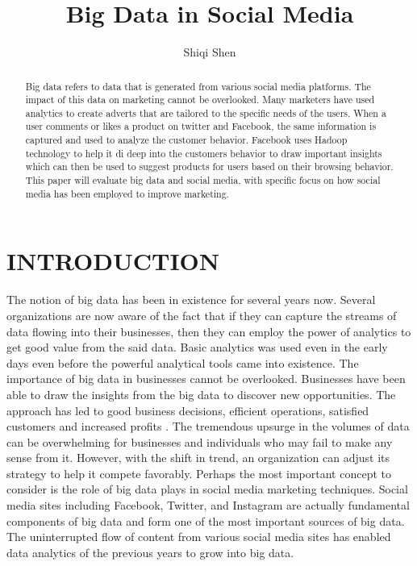 \documentclass[sigconf]{acmart}
\begin{document}
\title{Big Data in Social Media}


\author{Shiqi Shen}


\begin{abstract}

    Big data refers to data that is generated from various social media platforms. The impact of this data on marketing cannot be overlooked. Many marketers have used analytics to create adverts that are tailored to the specific needs of the users. When a user comments or likes a product on twitter and Facebook, the same information is captured and used to analyze the customer behavior. Facebook uses Hadoop technology to help it di deep into the customers behavior to draw important insights which can then be used to suggest products for users based on their browsing behavior. This paper will evaluate big data and social media, with specific focus on how social media has been employed to improve marketing.
    
\end{abstract}


\maketitle

\section{INTRODUCTION}

The notion of big data has been in existence for several years now. Several organizations are now aware of the fact that if they can capture the streams of data flowing into their businesses, then they can employ the power of analytics to get good value from the said data. Basic analytics was used even in the early days even before the powerful analytical tools came into existence. The importance of big data in businesses cannot be overlooked. Businesses have been able to draw the insights from the big data to discover new opportunities. The approach has led to good business decisions, efficient operations, satisfied customers and increased profits \cite{Singh2016}. The tremendous upsurge in the volumes of data can be overwhelming for businesses and individuals who may fail to make any sense from it. However, with the shift in trend, an organization can adjust its strategy to help it compete favorably. Perhaps the most important concept to consider is the role of big data plays in social media marketing techniques. Social media sites including Facebook, Twitter, and Instagram are actually fundamental components of big data and form one of the most important sources of big data. The uninterrupted flow of content from various social media sites has enabled data analytics of the previous years to grow into big data.
\end{document}
